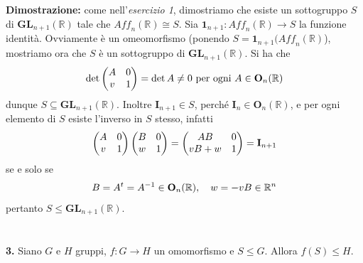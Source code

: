 \documentclass{article}
\begin{document}
\textbf{Dimostrazione:} come nell'\textit{esercizio 1}, dimostriamo che esiste un sottogruppo $S$ di $\mathbf{GL}_{n + 1}(\mathbb{R})$ tale che $\textit{Aff}_n(\mathbb{R}) \cong S$. Sia $\mathbf{1}_{n + 1} : \textit{Aff}_n(\mathbb{R}) \longrightarrow S$ la funzione identità. Ovviamente è un omeomorfismo (ponendo $S = \mathbf{1}_{n + 1}(\textit{Aff}_n(\mathbb{R})$), mostriamo ora che $S$ è un sottogruppo di $\mathbf{GL}_{n + 1}(\mathbb{R})$. Si ha che
\begin{gather}
    \det \begin{pmatrix}
        A & 0 \\
        v & 1
    \end{pmatrix} = \det A \neq 0 \text{ per ogni } A \in \mathbf{O}_n(\mathbb{R}) \notag
\end{gather}
dunque $S \subseteq \mathbf{GL}_{n + 1}(\mathbb{R})$. Inoltre $\mathbf{I}_{n + 1} \in S$, perché $\mathbf{I}_n \in \mathbf{O}_n(\mathbb{R})$, e per ogni elemento di $S$ esiste l'inverso in $S$ stesso, infatti
\begin{gather}
    \begin{pmatrix}
        A & 0 \\
        v & 1
    \end{pmatrix}
    \begin{pmatrix}
        B & 0 \\
        w & 1
    \end{pmatrix} = 
    \begin{pmatrix}
        AB & 0 \\
        vB + w & 1
    \end{pmatrix} = \mathbf{I}_{n + 1} \notag
\end{gather}
se e solo se
\begin{gather}
    B = A^t = A^{-1} \in \mathbf{O}_n(\mathbb{R}), \quad w = -vB \in \mathbb{R}^n \notag
\end{gather}
pertanto $S \leq \mathbf{GL}_{n + 1}(\mathbb{R})$. \\ \\ \\
\textbf{3.} Siano $G$ e $H$ gruppi, $f : G \longrightarrow H$ un omomorfismo e $S \leq G$. Allora $f(S) \leq H$. \\
\end{document}
